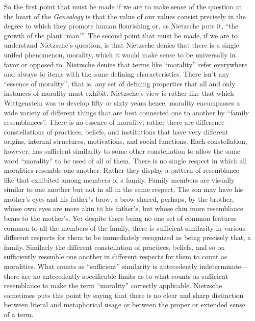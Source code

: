 So the first point that must be made if we are to make sense of the question at the heart of the \emph{Genealogy} is that the value of our values consist precisely in the degree to which they promote human flourishing or, as Nietzsche puts it, ``the growth of the plant `man'''. The second point that must be made, if we are to understand Nietzsche's question, is that Nietzsche denies that there is a single unifed phenomenon, morality, which it would make sense to be universally in favor or opposed to. Nietzsche denies that terms like ``morality'' refer everywhere and always to items with the same defining characteristics. There isn't any ``essence of morality'', that is, any set of defining properties that all and only instances of morality must exhibit. Nietzsche's view is rather like that which Wittgenstein was to develop fifty or sixty years hence: morality encompasses a wide variety of different things that are best connected one to another by ``family resemblances''. There is no essence of morality; rather there are difference constellations of practices, beliefs, and institutions that have very different origins, internal structures, motivations, and social functions. Each constellation, however, has sufficient similarity to some other constellation to allow the same word ``morality'' to be used of all of them. There is no single respect in which all moralities resemble one another. Rather they display a pattern of resemblance like that exhibited among members of a family. Family members are visually similar to one another but not in all in the same respect. The son may have his mother's eyes and his father's brow, a brow shared, perhaps, by the brother, whose own eyes are more akin to his father's, but whose chin more resemblance bears to the mother's. Yet despite there being no one set of common features common to all the members of the family, there is sufficient similarity in various different respects for them to be immediately recognized as being precisely that, a family. Similarly the different constellation of practices, beliefs, and so on sufficiently resemble one another in different respects for them to count as moralities. What counts as ``sufficient'' similarity is antecedently indeterminate---there are no antecedently specificable limits as to what counts as sufficient resemblance to make the term ``morality'' correctly applicable. Nietzsche sometimes puts this point by saying that there is no clear and sharp distinction between literal and metaphorical usage or between the proper or extended sense of a term.

